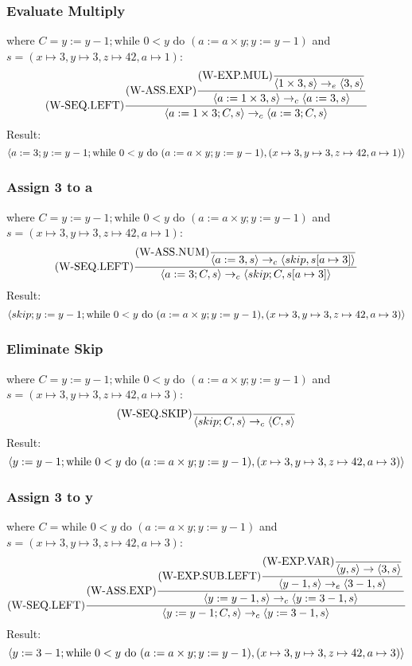 \documentclass{report}
\begin{document}
            \subsubsection*{Evaluate Multiply}
                where $C = y:= y - 1;  \text{while } 0<y \text{ do } (a:= a \times y; y:= y - 1)$ and $s = (x \mapsto 3, y \mapsto 3, z \mapsto 42, a \mapsto 1)$:
                \[\text{(W-SEQ.LEFT)}\dfrac{
                    \text{(W-ASS.EXP)}\dfrac{
                        \text{(W-EXP.MUL)}\dfrac{}{\langle 1 \times 3, s \rangle \to_e \langle 3, s \rangle}
                    }{\langle a := 1 \times 3, s \rangle \to_c \langle a := 3, s \rangle}
                }{\langle a := 1 \times 3; C, s \rangle \to_c \langle a := 3; C, s \rangle}\]
                Result:
                \[\langle a := 3; y:= y - 1;  \text{while } 0<y \text{ do } (a:= a \times y; y:= y - 1), (x \mapsto 3, y \mapsto 3, z \mapsto 42, a \mapsto 1) \rangle\]
            \subsubsection*{Assign 3 to a}
                where $C = y:= y - 1;  \text{while } 0<y \text{ do } (a:= a \times y; y:= y - 1)$ and $s = (x \mapsto 3, y \mapsto 3, z \mapsto 42, a \mapsto 1)$:
                \[\text{(W-SEQ.LEFT)}\dfrac{
                    \text{(W-ASS.NUM)}\dfrac{}{\langle a := 3, s \rangle \to_c \langle skip, s[a \mapsto 3] \rangle}
                }{\langle a := 3; C, s \rangle \to_c \langle skip;C, s[a \mapsto 3] \rangle}\]
                Result:
                \[\langle skip; y:= y - 1;  \text{while } 0<y \text{ do } (a:= a \times y; y:= y - 1), (x \mapsto 3, y \mapsto 3, z \mapsto 42, a \mapsto 3) \rangle\]
            \subsubsection*{Eliminate Skip}
                where $C = y:= y - 1;  \text{while } 0<y \text{ do } (a:= a \times y; y:= y - 1)$ and $s = (x \mapsto 3, y \mapsto 3, z \mapsto 42, a \mapsto 3)$:
                \[\text{(W-SEQ.SKIP)}\dfrac{}{\langle skip;C, s \rangle \to_c \langle C, s \rangle}\]
                Result:
                \[\langle y:= y - 1;  \text{while } 0<y \text{ do } (a:= a \times y; y:= y - 1), (x \mapsto 3, y \mapsto 3, z \mapsto 42, a \mapsto 3) \rangle\]
            \subsubsection*{Assign 3 to y}
                where $C = \text{while } 0<y \text{ do } (a:= a \times y; y:= y - 1)$ and $s = (x \mapsto 3, y \mapsto 3, z \mapsto 42, a \mapsto 3)$:
                \[\text{(W-SEQ.LEFT)}\dfrac{
                    \text{(W-ASS.EXP)}\dfrac{
                        \text{(W-EXP.SUB.LEFT)}\dfrac{
                            \text{(W-EXP.VAR)}\dfrac{}{\langle y, s \rangle \to \langle 3, s \rangle}
                        }{\langle y - 1, s \rangle \to_e \langle 3 - 1, s \rangle}
                    }{\langle y := y - 1, s \rangle \to_c \langle y := 3 - 1, s \rangle}
                }{\langle y := y - 1; C, s \rangle \to_c \langle y := 3 - 1, s \rangle}\]
                Result:
                \[\langle y:= 3 - 1;  \text{while } 0<y \text{ do } (a:= a \times y; y:= y - 1), (x \mapsto 3, y \mapsto 3, z \mapsto 42, a \mapsto 3) \rangle\]
\end{document}

